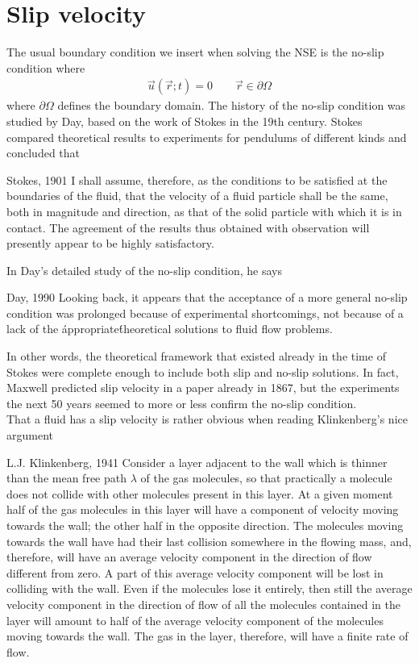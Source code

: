 \section{Slip velocity}
\label{sec:slip_length}
The usual boundary condition we insert when solving the NSE is the no-slip condition where
\begin{align}
	\vec u(\vec r; t) = 0 \qquad \vec r \in \partial\Omega
\end{align}
where $\partial\Omega$ defines the boundary domain. The history of the no-slip condition was studied by Day\cite{day1990no}, based on the work of Stokes in the 19th century. Stokes compared theoretical results to experiments for pendulums of different kinds and concluded that
\begin{aquote}{Stokes, 1901}
	I shall assume, therefore, as the conditions to be satisfied at the boundaries of the fluid, that the velocity of a fluid particle shall be the same, both in magnitude and direction, as that of the solid particle with which it is in contact. The agreement of the results thus obtained with observation will presently appear to be highly satisfactory.
\end{aquote}
In Day's detailed study of the no-slip condition, he says
\begin{aquote}{Day, 1990}
	Looking back, it appears that the acceptance of a more general no-slip condition was prolonged because of experimental shortcomings, not because of a lack of the \'appropriate\' theoretical solutions to fluid flow problems.
\end{aquote}
In other words, the theoretical framework that existed already in the time of Stokes were complete enough to include both slip and no-slip solutions. In fact, Maxwell predicted slip velocity in a paper already in 1867\cite{maxwell1879stresses}, but the experiments the next 50 years seemed to more or less confirm the no-slip condition.\\
That a fluid has a slip velocity is rather obvious when reading Klinkenberg's nice argument
\begin{aquote}{L.J. Klinkenberg, 1941}
Consider a layer adjacent to the wall which is thinner than the mean free path $\lambda$ of the gas molecules, so that practically a molecule does not collide with other molecules present in this layer. At a given moment half of the gas molecules in this layer will have a component of velocity moving towards the wall; the other half in the opposite direction. The molecules moving towards the wall have had their last collision somewhere in the flowing mass, and, therefore, will have an average velocity component in the direction of flow different from zero. A part of this average velocity component will be lost in colliding with the wall. Even if the molecules lose it entirely, then still the average velocity component in the direction of flow of all the molecules contained in the layer will amount to half of the average velocity component of the molecules moving towards the wall. The gas in the layer, therefore, will have a finite rate of flow.
\end{aquote}
